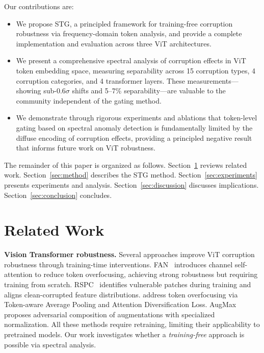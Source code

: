 \documentclass{article}
\newcommand{\methodname}{STG}
\begin{document}
Our contributions are:
\begin{itemize}
    \item We propose \methodname{}, a principled framework for training-free corruption robustness via frequency-domain token analysis, and provide a complete implementation and evaluation across three ViT architectures.
    \item We present a comprehensive spectral analysis of corruption effects in ViT token embedding space, measuring separability across 15 corruption types, 4 corruption categories, and 4 transformer layers. These measurements---showing sub-$0.6\sigma$ shifts and 5--7\% separability---are valuable to the community independent of the gating method.
    \item We demonstrate through rigorous experiments and ablations that token-level gating based on spectral anomaly detection is fundamentally limited by the diffuse encoding of corruption effects, providing a principled negative result that informs future work on ViT robustness.
\end{itemize}

The remainder of this paper is organized as follows. Section~\ref{sec:related} reviews related work. Section~\ref{sec:method} describes the \methodname{} method. Section~\ref{sec:experiments} presents experiments and analysis. Section~\ref{sec:discussion} discusses implications. Section~\ref{sec:conclusion} concludes.

\section{Related Work}
\label{sec:related}

\textbf{Vision Transformer robustness.} Several approaches improve ViT corruption robustness through training-time interventions. FAN~\citep{zhou2022understanding} introduces channel self-attention to reduce token overfocusing, achieving strong robustness but requiring training from scratch. RSPC~\citep{guo2023improving} identifies vulnerable patches during training and aligns clean-corrupted feature distributions. \citet{guo2023robustifying} address token overfocusing via Token-aware Average Pooling and Attention Diversification Loss. AugMax~\citep{wang2021augmax} proposes adversarial composition of augmentations with specialized normalization. All these methods require retraining, limiting their applicability to pretrained models. Our work investigates whether a \emph{training-free} approach is possible via spectral analysis.
\end{document}
